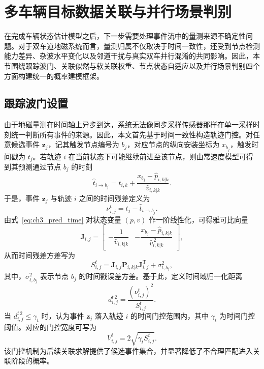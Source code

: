 \documentclass{xdupgthesis}
\begin{document}
\section{多车辆目标数据关联与并行场景判别}
\label{sec:ch3_association}

在完成车辆状态估计模型之后，下一步需要处理事件流中的量测来源不确定性问题。对于双车道地磁系统而言，量测归属不仅取决于时间一致性，还受到节点检测能力差异、杂波水平变化以及邻道干扰与真实双车并行混淆的共同影响。因此，本节围绕跟踪波门、关联似然与软关联权重、节点状态自适应以及并行场景判别四个方面构建统一的概率建模框架。

\subsection{跟踪波门设置}

由于地磁量测在时间轴上异步到达，系统无法像同步采样传感器那样在单一采样时刻统一判断所有事件的来源。因此，本文首先基于时间一致性构造轨迹门控。对任意候选事件 $\mathbf z_j$，记其触发节点编号为 $b_j$，对应节点的纵向安装坐标为 $x_{b_j}$，触发时间戳为 $t_j$。若轨迹 $i$ 在当前状态下可能继续前进至该节点，则由常速度模型可得到其预测通过节点 $b_j$ 的时刻
\begin{equation}
	\hat t_{i\rightarrow b_j}
	=
	t_{i,k}+\frac{x_{b_j}-\hat p_{i,k|k}}{\hat v_{i,k|k}}.
	\label{eq:ch3_pred_time}
\end{equation}
于是，事件 $\mathbf z_j$ 与轨迹 $i$ 之间的时间残差定义为
\begin{equation}
	\nu^{t}_{i,j}=t_j-\hat t_{i\rightarrow b_j}.
	\label{eq:ch3_time_residual}
\end{equation}
由式~\eqref{eq:ch3_pred_time} 对状态变量 $(p,v)$ 作一阶线性化，可得雅可比向量
\begin{equation}
	\mathbf J_{i,j}
	=
	\begin{bmatrix}
		-\dfrac{1}{\hat v_{i,k|k}} & -\dfrac{x_{b_j}-\hat p_{i,k|k}}{\hat v_{i,k|k}^{\,2}}
	\end{bmatrix},
	\label{eq:ch3_time_jacobian}
\end{equation}
从而时间残差方差写为
\begin{equation}
	S^{t}_{i,j}=\mathbf J_{i,j}\mathbf P_{i,k|k}\mathbf J_{i,j}^{\mathrm T}+\sigma_{t,b_j}^{2},
	\label{eq:ch3_time_var}
\end{equation}
其中，$\sigma_{t,b_j}^{2}$ 表示节点 $b_j$ 的时间戳误差方差。基于此，定义时间域归一化距离
\begin{equation}
	d^{t\,2}_{i,j}=\frac{\left(\nu^{t}_{i,j}\right)^2}{S^{t}_{i,j}}.
	\label{eq:ch3_time_maha}
\end{equation}
当 $d^{t\,2}_{i,j}\le \gamma_t$ 时，认为事件 $\mathbf z_j$ 落入轨迹 $i$ 的时间门控范围内，其中 $\gamma_t$ 为时间门控阈值。对应的门控宽度可写为
\begin{equation}
	V^{t}_{i,j}=2\sqrt{\gamma_t S^{t}_{i,j}}.
	\label{eq:ch3_gate_width_time}
\end{equation}
该门控机制为后续关联求解提供了候选事件集合，并显著降低了不合理匹配进入关联阶段的概率。
\end{document}
